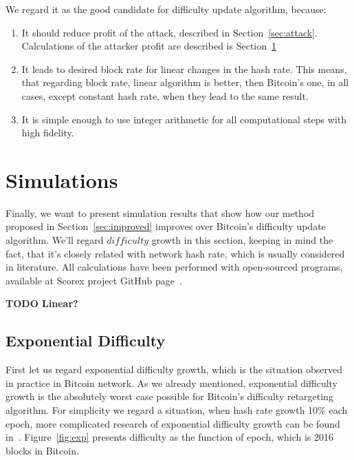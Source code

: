 \documentclass[number,preprint,review]{elsarticle}
\begin{document}
We regard it as the good candidate for difficulty update algorithm, because:
\begin{enumerate}
\item{It should reduce profit of the attack, described in Section~\ref{sec:attack}.
Calculations of the attacker profit are described is Section~\ref{sec:sim}}
\item{It leads to desired block rate for linear changes in the hash rate.
This means, that regarding block rate, linear algorithm is better, then Bitcoin's one, in all cases, except constant hash rate, when they lead to the same result. }
\item{It is simple enough to use integer arithmetic for all computational steps with high fidelity.}
\end{enumerate}

\section{Simulations}
\label{sec:sim}

Finally, we want to present simulation results that show how our method proposed in Section~\ref{sec:improved} improves over Bitcoin’s difficulty update algorithm.
We'll regard \(difficulty\) growth in this section, keeping in mind the fact, that it's closely related with network hash rate, which is usually considered in literature.
All calculations have been performed with open-sourced programs, available at Scorex project GitHub page~\cite{scorex}.

\textbf{TODO Linear?}

\subsection{Exponential Difficulty}

First let us regard exponential difficulty growth, which is the situation observed in practice in Bitcoin network.
As we already mentioned, exponential difficulty growth is the absolutely worst case possible for Bitcoin’s difficulty retargeting algorithm.
For simplicity we regard a situation, when hash rate growth 10\% each epoch, more complicated research of exponential difficulty growth can be found in~\cite{kraft2015difficulty}.
Figure~\ref{fig:exp} presents difficulty as the function of epoch, which is 2016 blocks in Bitcoin.
\end{document}
